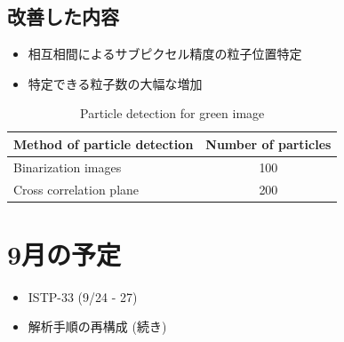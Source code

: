 \documentclass[twocolumn,a4j]{jsarticle}
\begin{document}
\subsection{改善した内容}
\begin{itemize}
  \item 相互相間によるサブピクセル精度の粒子位置特定
  \item 特定できる粒子数の大幅な増加
\end{itemize}

\begin{table}[hbtp]
  \centering
  \caption{Particle detection for green image}
  \begin{tabular}{l c}
    \hline
    Method of particle detection & Number of particles \\ \hline \hline
    Binarization images          & 100                 \\ \hline
    Cross correlation plane      & 200                 \\ \hline
  \end{tabular}
\end{table}



\section{9月の予定}
\begin{itemize}
  \item ISTP-33 (9/24 - 27)
  \item 解析手順の再構成 (続き)
\end{itemize}
\end{document}
